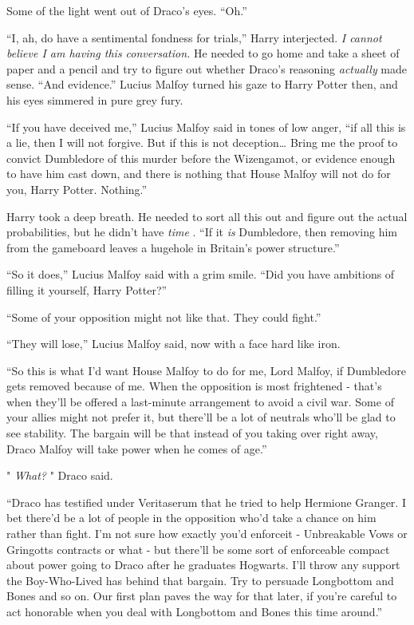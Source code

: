 Some of the light went out of Draco's eyes. ``Oh.''

``I, ah, do have a sentimental fondness for trials,'' Harry interjected.
\emph{I cannot believe I am having this conversation.} He needed to go home and take a sheet of paper and a pencil and try to figure out whether Draco's reasoning \emph{actually} made sense. ``And evidence.''
Lucius Malfoy turned his gaze to Harry Potter then, and his eyes simmered in pure grey fury.

``If you have deceived me,'' Lucius Malfoy said in tones of low anger, ``if all this is a lie, then I will not forgive. But if this is not deception\ldots{} Bring me the proof to convict Dumbledore of this murder before the Wizengamot, or evidence enough to have him cast down, and there is nothing that House Malfoy will not do for you, Harry Potter. Nothing.''

Harry took a deep breath. He needed to sort all this out and figure out the actual probabilities, but he didn't have \emph{time} . ``If it
\emph{is} Dumbledore, then removing him from the gameboard leaves a hugehole in Britain's power structure.''

``So it does,'' Lucius Malfoy said with a grim smile. ``Did you have ambitions of filling it yourself, Harry Potter?''

``Some of your opposition might not like that. They could fight.''

``They will lose,'' Lucius Malfoy said, now with a face hard like iron.

``So this is what I'd want House Malfoy to do for me, Lord Malfoy, if Dumbledore gets removed because of me. When the opposition is most frightened - that's when they'll be offered a last-minute arrangement to avoid a civil war. Some of your allies might not prefer it, but there'll be a lot of neutrals who'll be glad to see stability. The bargain will be that instead of you taking over right away, Draco Malfoy will take power when he comes of age.''

" \emph{What?} " Draco said.

``Draco has testified under Veritaserum that he tried to help Hermione Granger. I bet there'd be a lot of people in the opposition who'd take a chance on him rather than fight. I'm not sure how exactly you'd enforceit - Unbreakable Vows or Gringotts contracts or what - but there'll be some sort of enforceable compact about power going to Draco after he graduates Hogwarts. I'll throw any support the Boy-Who-Lived has behind that bargain. Try to persuade Longbottom and Bones and so on. Our first plan paves the way for that later, if you're careful to act honorable when you deal with Longbottom and Bones this time around.''

